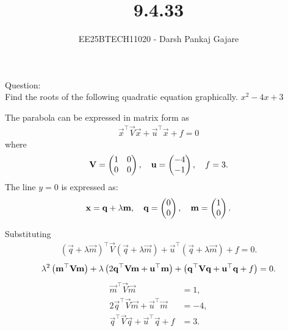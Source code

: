 \documentclass{beamer}
\let\solution\relax
\numberwithin{equation}{section}
\begin{document}
\title{9.4.33}
\author{EE25BTECH11020 - Darsh Pankaj Gajare}
{\let\newpage\relax\maketitle}

Question:\\ Find the roots of the following quadratic equation graphically.
$x^2-4x+3$\\
\solution

The parabola can be expressed in matrix form as
\begin{align}
	\vec{x}^\top \vec{V} \vec{x} + \vec{u}^\top\vec{x} + f = 0
\end{align}
where
\begin{align}
	\mathbf{V} = \begin{pmatrix}1 & 0 \\ 0 & 0\end{pmatrix}, \quad 
    \mathbf{u} = \begin{pmatrix}-4 \\ -1\end{pmatrix}, \quad 
    f = 3.
\end{align}
The line $y=0$ is expressed as:
\begin{align}
    \mathbf{x} = \mathbf{q} + \lambda \mathbf{m}, \quad 
    \mathbf{q} = \begin{pmatrix}0 \\ 0\end{pmatrix}, \quad 
    \mathbf{m} = \begin{pmatrix}1 \\ 0\end{pmatrix}.
\end{align}

Substituting
\begin{align}
	(\vec{q} + \lambda\vec{m})^\top \vec{V} (\vec{q} + \lambda\vec{m}) 
    + \vec{u}^\top(\vec{q} + \lambda\vec{m}) + f = 0.
\end{align}
\begin{align}
	\lambda^2 \left(\mathbf{m}^\top \mathbf{V} \mathbf{m}\right)
	+ \lambda \left(2\mathbf{q}^\top \mathbf{V} \mathbf{m} + \mathbf{u}^\top \mathbf{m}\right)
	+ \left(\mathbf{q}^\top \mathbf{V} \mathbf{q} + \mathbf{u}^\top \mathbf{q} + f\right) = 0.
\end{align}
\begin{align}
	\vec{m}^\top \vec{V} \vec{m} &= 1, \\
	2\vec{q}^\top \vec{V} \vec{m} + \vec{u}^\top \vec{m} &= -4, \\
	\vec{q}^\top \vec{V} \vec{q} + \vec{u}^\top \vec{q} + f &= 3.
\end{align}
\end{document}

